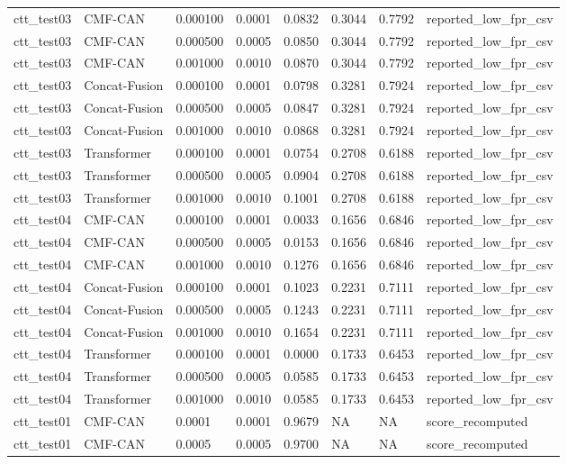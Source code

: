\begin{tabular}{llllllll}
ctt_test03 & CMF-CAN & 0.000100 & 0.0001 & 0.0832 & 0.3044 & 0.7792 & reported_low_fpr_csv \\
ctt_test03 & CMF-CAN & 0.000500 & 0.0005 & 0.0850 & 0.3044 & 0.7792 & reported_low_fpr_csv \\
ctt_test03 & CMF-CAN & 0.001000 & 0.0010 & 0.0870 & 0.3044 & 0.7792 & reported_low_fpr_csv \\
ctt_test03 & Concat-Fusion & 0.000100 & 0.0001 & 0.0798 & 0.3281 & 0.7924 & reported_low_fpr_csv \\
ctt_test03 & Concat-Fusion & 0.000500 & 0.0005 & 0.0847 & 0.3281 & 0.7924 & reported_low_fpr_csv \\
ctt_test03 & Concat-Fusion & 0.001000 & 0.0010 & 0.0868 & 0.3281 & 0.7924 & reported_low_fpr_csv \\
ctt_test03 & Transformer & 0.000100 & 0.0001 & 0.0754 & 0.2708 & 0.6188 & reported_low_fpr_csv \\
ctt_test03 & Transformer & 0.000500 & 0.0005 & 0.0904 & 0.2708 & 0.6188 & reported_low_fpr_csv \\
ctt_test03 & Transformer & 0.001000 & 0.0010 & 0.1001 & 0.2708 & 0.6188 & reported_low_fpr_csv \\
ctt_test04 & CMF-CAN & 0.000100 & 0.0001 & 0.0033 & 0.1656 & 0.6846 & reported_low_fpr_csv \\
ctt_test04 & CMF-CAN & 0.000500 & 0.0005 & 0.0153 & 0.1656 & 0.6846 & reported_low_fpr_csv \\
ctt_test04 & CMF-CAN & 0.001000 & 0.0010 & 0.1276 & 0.1656 & 0.6846 & reported_low_fpr_csv \\
ctt_test04 & Concat-Fusion & 0.000100 & 0.0001 & 0.1023 & 0.2231 & 0.7111 & reported_low_fpr_csv \\
ctt_test04 & Concat-Fusion & 0.000500 & 0.0005 & 0.1243 & 0.2231 & 0.7111 & reported_low_fpr_csv \\
ctt_test04 & Concat-Fusion & 0.001000 & 0.0010 & 0.1654 & 0.2231 & 0.7111 & reported_low_fpr_csv \\
ctt_test04 & Transformer & 0.000100 & 0.0001 & 0.0000 & 0.1733 & 0.6453 & reported_low_fpr_csv \\
ctt_test04 & Transformer & 0.000500 & 0.0005 & 0.0585 & 0.1733 & 0.6453 & reported_low_fpr_csv \\
ctt_test04 & Transformer & 0.001000 & 0.0010 & 0.0585 & 0.1733 & 0.6453 & reported_low_fpr_csv \\
ctt_test01 & CMF-CAN & 0.0001 & 0.0001 & 0.9679 & NA & NA & score_recomputed \\
ctt_test01 & CMF-CAN & 0.0005 & 0.0005 & 0.9700 & NA & NA & score_recomputed \\

\end{tabular}

